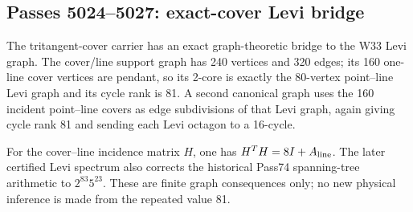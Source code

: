 \subsection*{Passes 5024--5027: exact-cover Levi bridge}
The tritangent-cover carrier has an exact graph-theoretic bridge to the W33 Levi graph. The cover/line support graph has 240 vertices and 320 edges; its 160 one-line cover vertices are pendant, so its 2-core is exactly the 80-vertex point--line Levi graph and its cycle rank is 81. A second canonical graph uses the 160 incident point--line covers as edge subdivisions of that Levi graph, again giving cycle rank 81 and sending each Levi octagon to a 16-cycle.

For the cover--line incidence matrix $H$, one has $H^T H=8I+A_{\rm line}$. The later certified Levi spectrum also corrects the historical Pass74 spanning-tree arithmetic to $2^{83}5^{23}$. These are finite graph consequences only; no new physical inference is made from the repeated value 81.
